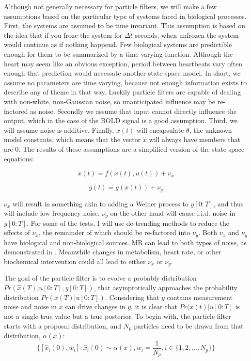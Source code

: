 \documentclass{article}
\begin{document}
Although not generally necessary for particle filters, we will make a few
assumptions based on the particular type of systems faced in biological 
processes. First, the systems are assumed to be time invariant. This 
assumption is based on the idea that if you froze the system for $\Delta t$
seconds, when unfrozen the system would continue as if nothing happend. 
Few biological systems are predictible enough for them to be summarized
by a time varying function. Although the heart may seem like an obvious
exception, period between heartbeats vary often enough that prediction
would necessate another state-space model. In short, we
assume no parameters are time varying, because not enough information exists to
describe any of theme in that way. Luckily particle filters are capable 
of dealing with non-white, non-Gaussian noise, so unanticipated influence
may be re-factored as noise. Secondly we assume that input cannot directly
influence the output, which in the case of the BOLD signal is a good assumption.
Third, we will assume noise is additive.
Finally, $x(t)$ will encapsulate $\theta$, the unknown model constants, which
means that the vector $\dot{x}$ will always have members
that are 0. The results of these assumptions are a simplified version of the
state space equations:

\begin{equation}
\dot{x}(t) = f(x(t), u(t)) + \nu_x
\end{equation}

\begin{equation}
y(t) = g(x(t)) + \nu_y
\end{equation}

$\nu_x$ will result in something akin to adding a Weiner process to $y[0:T]$, and thus
will include low frequency noise. $\nu_y$ on the other hand will cause i.i.d. noise
in $y[0:T]$. For some of the tests, I will use de-trending methods to reduce the effects of 
$\nu_x$, the remainder of which should be re-factored into $\nu_y$. Both $\nu_x$ and $\nu_y$
have biological and non-biological sources. MR can lead to both types of noise, 
as demonstrated in \cite{drift}. Meanwhile changes in metabolism, heart rate, or
other biochemical intervention could all lead to either $\nu_x$ or $\nu_y$.

The goal of the particle filter is to evolve a probably distribution 
$Pr(\hat{x}(T) | u[0:T], y[0:T])$,
that asymptotically approaches the probability distribution $Pr(x(T) | u[0:T])$.
Considering that $y$ contains measurement noise and noise in $x$ can drive
changes in $y$, it is clear that $Pr(x(t) | u[0:T]$ is not a single true value
but a true posterior. 
To begin with, the particle filter starts with a proposal distribution, and $N_p$
particles need to be drawn from that distribution, $\alpha(x)$:
\begin{equation}
\{[\hat{x}_i(0),w_i] : \hat{x}_i(0) \sim \alpha(x), w_i = \frac{1}{N_p}, i \in \{1, 2, ... , N_p\} \}
\end{equation}
\end{document}

